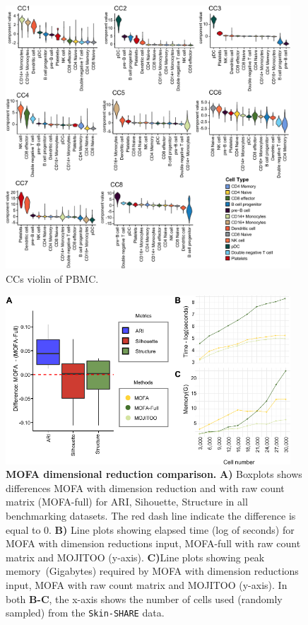 \begin{figure}[!ht]
  \centering
  \includegraphics[width=0.95\textwidth]{CCs_violin/fig}
  \vspace{0.1cm}
  \caption[CCs violin of PBMC.]{CCs violin of PBMC.}
  \label{fig:CCs_violin}
\end{figure}


\begin{figure}[!ht]
	\centering
	\includegraphics[width=0.95\textwidth]{MOFA/fig}
	\vspace{0.1cm}
	\caption[MOFA dimensional reduction comparison.]{\textbf{MOFA dimensional reduction comparison.} \textbf{A)} Boxplots shows differences MOFA with dimension reduction and with raw count matrix (MOFA-full) for ARI, Sihouette, Structure in all benchmarking datasets. The red dash line indicate the difference is equal to 0. \textbf{B)} Line plots showing elapsed time (log of seconds) for MOFA with dimension reductions input, MOFA-full with raw count matrix and MOJITOO (y-axis). \textbf{C)}Line plots showing peak memory~(Gigabytes) required by MOFA with dimension reductions input, MOFA with raw count matrix and MOJITOO (y-axis). In both \textbf{B-C}, the x-axis shows the number of cells used (randomly sampled) from the \texttt{Skin-SHARE} data.}
	\label{fig:MOFA}
\end{figure}


